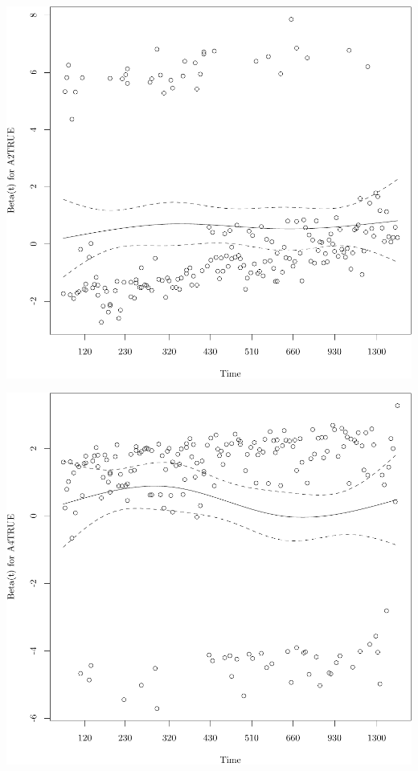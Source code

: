 \documentclass{article}\usepackage[]{graphicx}\usepackage[]{color}
\makeatletter
\def\maxwidth{ %
  \ifdim\Gin@nat@width>\linewidth
    \linewidth
  \else
    \Gin@nat@width
  \fi
}
\newenvironment{knitrout}{}{} %
\makeatother
\begin{document}
\begin{knitrout}
{\centering \includegraphics[width=\maxwidth]{figure/05-eda-ph-check-reduced-2} 

}




{\centering \includegraphics[width=\maxwidth]{figure/05-eda-ph-check-reduced-3} 

}



\end{knitrout}
\end{document}
